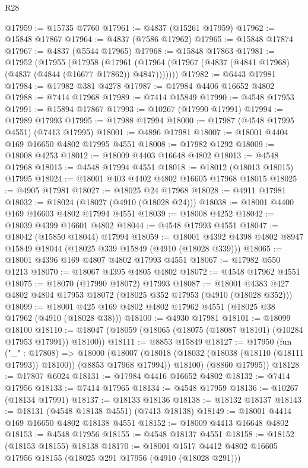 \begin{lexlean}{R28}
\begin{coremodule}
@17959 := @15735 @7760
@17961 := @4837 (@15261 @17959)
@17962 := @15848 @17867
@17964 := @4837 (@7586 @17962)
@17965 := @15848 @17874
@17967 := @4837 (@5544 @17965)
@17968 := @15848 @17863
@17981 := @17952
    (@17955
      (@17958
        (@17961 (@17964 (@17967 (@4837 (@4841 @17968) (@4837 (@4844 (@16677 @17862)) @4847)))))))
@17982 := @6443 @17981
@17984 := @17982 @381 @4278
@17987 := @17984 @4406 @16652 @4802
@17988 := @7414 @17968
@17989 := @7414 @15849
@17990 := @4548 @17953
@17991 := @15894 @17867
@17993 := @10267 (@17990 @17991)
@17994 := @17989 @17993
@17995 := @17988 @17994
@18000 := @17987 (@4548 @17995 @4551) (@7413 @17995)
@18001 := @4896 @17981
@18007 := @18001 @4404 @169 @16650 @4802 @17995 @4551
@18008 := @17982 @1292
@18009 := @18008 @4253
@18012 := @18009 @4403 @16648 @4802
@18013 := @4548 @17968
@18015 := @4548 @17994 @4551
@18018 := @18012 (@18013 @18015) @17995
@18024 := @18001 @403 @4402 @4802 @16605 @17968 @18015
@18025 := @4905 @17981
@18027 := @18025 @24 @17968
@18028 := @4911 @17981
@18032 := @18024 (@18027 (@4910 (@18028 @24)))
@18038 := @18001 @4400 @169 @16603 @4802 @17994 @4551
@18039 := @18008 @4252
@18042 := @18039 @4399 @16601 @4802
@18044 := @4548 @17993 @4551
@18047 := @18042 (@15850 @18044) @17994
@18059 := @18001 @4392 @4398 @4802 @8947 @15849 @18044 (@18025 @339 @15849 (@4910 (@18028 @339)))
@18065 := @18001 @4396 @169 @4807 @4802 @17993 @4551
@18067 := @17982 @550 @1213
@18070 := @18067 @4395 @4805 @4802
@18072 := @4548 @17962 @4551
@18075 := @18070 (@17990 @18072) @17993
@18087 := @18001 @4383 @427 @4802 @4804 @17953 @18072 (@18025 @352 @17953 (@4910 (@18028 @352)))
@18099 := @18001 @425 @169 @4802 @4802 @17962 @4551 (@18025 @38 @17962 (@4910 (@18028 @38)))
@18100 := @4930 @17981
@18101 := @18099 @18100
@18110 := @18047 (@18059 (@18065 (@18075 (@18087 @18101) (@10284 @17953 @17991)) @18100))
@18111 := @8853 @15849
@18127 := @17950
    (fun ("_" : @17808) =>
    @18000
      (@18007
        (@18018 (@18032 (@18038 (@18110 (@18111 @17993)) @18100)) (@8853 @17968 @17994))
        @18100)
      (@8860 @17995))
@18128 := @17807 @6024
@18131 := @17984 @4416 @16652 @4802
@18132 := @7414 @17956
@18133 := @7414 @17965
@18134 := @4548 @17959
@18136 := @10267 (@18134 @17991)
@18137 := @18133 @18136
@18138 := @18132 @18137
@18143 := @18131 (@4548 @18138 @4551) (@7413 @18138)
@18149 := @18001 @4414 @169 @16650 @4802 @18138 @4551
@18152 := @18009 @4413 @16648 @4802
@18153 := @4548 @17956
@18155 := @4548 @18137 @4551
@18158 := @18152 (@18153 @18155) @18138
@18170 := @18001 @1517 @4412 @4802 @16605 @17956 @18155 (@18025 @291 @17956 (@4910 (@18028 @291)))

\end{coremodule}
\end{lexlean}
